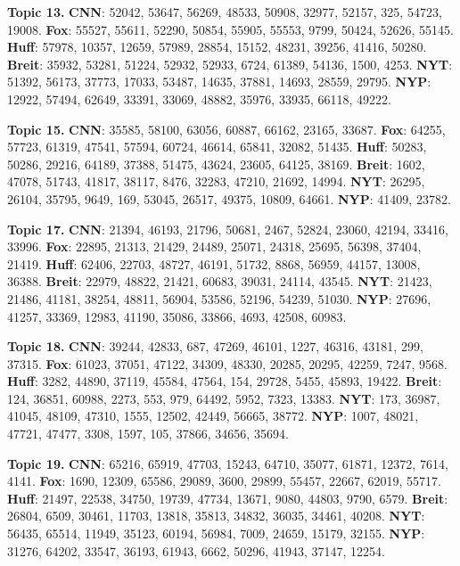\documentclass[11pt]{article}
\begin{document}
\textbf{Topic 13.}
\textbf{CNN}: 52042, 53647, 56269, 48533, 50908, 32977, 52157, 325, 54723, 19008.
\textbf{Fox}: 55527, 55611, 52290, 50854, 55905, 55553, 9799, 50424, 52626, 55145.
\textbf{Huff}: 57978, 10357, 12659, 57989, 28854, 15152, 48231, 39256, 41416, 50280.
\textbf{Breit}: 35932, 53281, 51224, 52932, 52933, 6724, 61389, 54136, 1500, 4253.
\textbf{NYT}: 51392, 56173, 37773, 17033, 53487, 14635, 37881, 14693, 28559, 29795.
\textbf{NYP}: 12922, 57494, 62649, 33391, 33069, 48882, 35976, 33935, 66118, 49222.

\textbf{Topic 15.}
\textbf{CNN}: 35585, 58100, 63056, 60887, 66162, 23165, 33687.
\textbf{Fox}: 64255, 57723, 61319, 47541, 57594, 60724, 46614, 65841, 32082, 51435.
\textbf{Huff}: 50283, 50286, 29216, 64189, 37388, 51475, 43624, 23605, 64125, 38169.
\textbf{Breit}: 1602, 47078, 51743, 41817, 38117, 8476, 32283, 47210, 21692, 14994.
\textbf{NYT}: 26295, 26104, 35795, 9649, 169, 53045, 26517, 49375, 10809, 64661.
\textbf{NYP}: 41409, 23782.


\textbf{Topic 17.}
\textbf{CNN}: 21394, 46193, 21796, 50681, 2467, 52824, 23060, 42194, 33416, 33996.
\textbf{Fox}: 22895, 21313, 21429, 24489, 25071, 24318, 25695, 56398, 37404, 21419.
\textbf{Huff}: 62406, 22703, 48727, 46191, 51732, 8868, 56959, 44157, 13008, 36388.
\textbf{Breit}: 22979, 48822, 21421, 60683, 39031, 24114, 43545.
\textbf{NYT}: 21423, 21486, 41181, 38254, 48811, 56904, 53586, 52196, 54239, 51030.
\textbf{NYP}: 27696, 41257, 33369, 12983, 41190, 35086, 33866, 4693, 42508, 60983.


\textbf{Topic 18.}
\textbf{CNN}: 39244, 42833, 687, 47269, 46101, 1227, 46316, 43181, 299, 37315.
\textbf{Fox}: 61023, 37051, 47122, 34309, 48330, 20285, 20295, 42259, 7247, 9568.
\textbf{Huff}: 3282, 44890, 37119, 45584, 47564, 154, 29728, 5455, 45893, 19422.
\textbf{Breit}: 124, 36851, 60988, 2273, 553, 979, 64492, 5952, 7323, 13383.
\textbf{NYT}: 173, 36987, 41045, 48109, 47310, 1555, 12502, 42449, 56665, 38772.
\textbf{NYP}: 1007, 48021, 47721, 47477, 3308, 1597, 105, 37866, 34656, 35694.


\textbf{Topic 19.}
\textbf{CNN}: 65216, 65919, 47703, 15243, 64710, 35077, 61871, 12372, 7614, 4141.
\textbf{Fox}: 1690, 12309, 65586, 29089, 3600, 29899, 55457, 22667, 62019, 55717.
\textbf{Huff}: 21497, 22538, 34750, 19739, 47734, 13671, 9080, 44803, 9790, 6579.
\textbf{Breit}: 26804, 6509, 30461, 11703, 13818, 35813, 34832, 36035, 34461, 40208.
\textbf{NYT}: 56435, 65514, 11949, 35123, 60194, 56984, 7009, 24659, 15179, 32155.
\textbf{NYP}: 31276, 64202, 33547, 36193, 61943, 6662, 50296, 41943, 37147, 12254.
\end{document}
